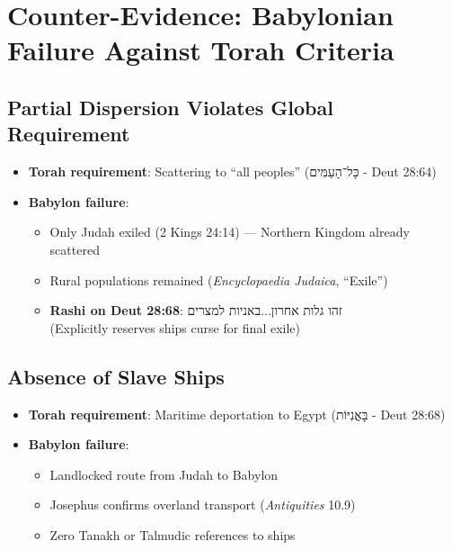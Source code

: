 \documentclass[12pt]{article}
\begin{document}
\section{Counter-Evidence: Babylonian Failure Against Torah Criteria}

\subsection{Partial Dispersion Violates Global Requirement}
\begin{itemize}
    \item \textbf{Torah requirement}: Scattering to ``all peoples'' \texthebrew{(כָּל־הָעַמִּים - Deut 28:64)}
    \item \textbf{Babylon failure}: 
    \begin{itemize}
        \item Only Judah exiled (2 Kings 24:14) — Northern Kingdom already scattered
        \item Rural populations remained (\textit{Encyclopaedia Judaica}, ``Exile'')
        \item \textbf{Rashi on Deut 28:68}: \texthebrew{זהו גלות אחרון...באניות למצרים} \\ (Explicitly reserves ships curse for final exile)
    \end{itemize}
\end{itemize}

\subsection{Absence of Slave Ships}
\begin{itemize}
    \item \textbf{Torah requirement}: Maritime deportation to Egypt \texthebrew{(בָּאֳנִיּוֹת - Deut 28:68)}
    \item \textbf{Babylon failure}:
    \begin{itemize}
        \item Landlocked route from Judah to Babylon
        \item Josephus confirms overland transport (\textit{Antiquities} 10.9)
        \item Zero Tanakh or Talmudic references to ships
    \end{itemize}
\end{itemize}
\end{document}
